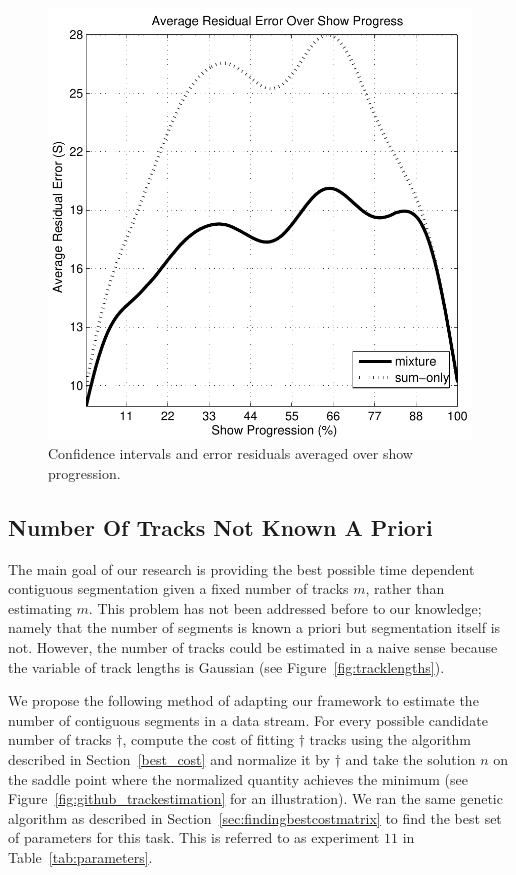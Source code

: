 \documentclass[twocolumn]{article}
\begin{document}
\begin{figure}
	\includegraphics[scale=0.4]{images/conf/residualsagainstprogress}
	
	\caption{Confidence intervals and error residuals averaged over show progression.}
	\label{fig:confidence_intervals}
	
\end{figure}


\subsection{Number Of Tracks Not Known A Priori}\label{sec:trackcount}

The main goal of our research is providing the best possible time dependent contiguous segmentation given a fixed number of tracks $m$, rather than estimating $m$. This problem has not been addressed before to our knowledge; namely that the number of segments is known a priori but segmentation itself is not. However, the number of tracks could be estimated in a naive sense because the variable of track lengths is Gaussian (see Figure~\ref{fig:tracklengths}). 


We propose the following method of adapting our framework to estimate the number of contiguous segments in a data stream. For every possible candidate number of tracks $\dag$, compute the cost of fitting $\dag$ tracks using the algorithm described in Section~\ref{best_cost} and normalize it by $\dag$ and take the solution $n$ on the saddle point where the normalized quantity achieves the minimum (see Figure~\ref{fig:github_trackestimation} for an illustration). We ran the same genetic algorithm as described in Section~\ref{sec:findingbestcostmatrix} to find the best set of parameters for this task. This is referred to as experiment $11$ in Table~\ref{tab:parameters}.
\end{document}
